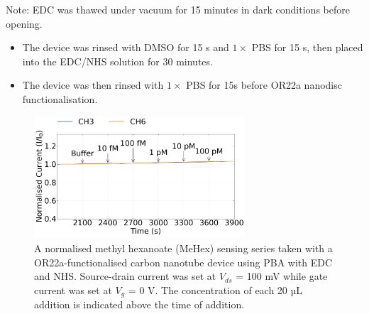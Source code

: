 \documentclass[
  a4paper,
]{scrbook}
\begin{document}
Note: EDC was thawed under vacuum for 15 minutes in dark conditions
before opening.

\begin{itemize}
\item
  The device was rinsed with DMSO for 15 s and \(1 \times\) PBS for 15
  s, then placed into the EDC/NHS solution for 30 minutes.
\item
  The device was then rinsed with \(1 \times\) PBS for 15s before OR22a
  nanodisc functionalisation.
\end{itemize}

\begin{figure}

{\centering \includegraphics[width=0.7\textwidth,height=\textheight]{figures/ch8/NTQ25D3_OR22a_sample_220218_EDCNHS.png}

}

\caption{\label{fig-EDCNHS-sensing}A normalised methyl hexanoate (MeHex)
sensing series taken with a OR22a-functionalised carbon nanotube device
using PBA with EDC and NHS. Source-drain current was set at \(V_{ds}\) =
100 mV while gate current was set at \(V_g\) = 0 V. The concentration of
each 20 µL addition is indicated above the time of addition.}

\end{figure}
\end{document}
